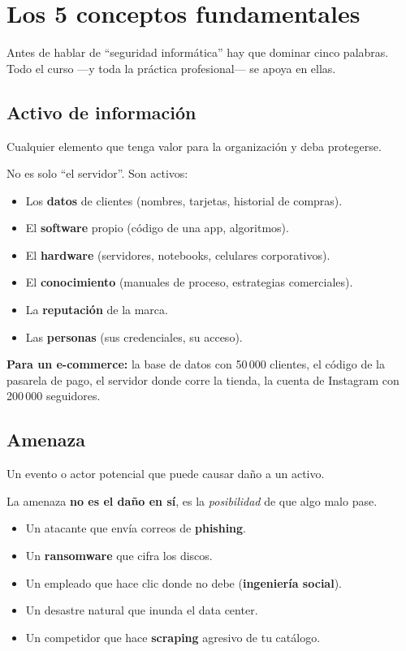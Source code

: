 \documentclass[12pt,a4paper]{article}
\begin{document}
\section{Los 5 conceptos fundamentales}

Antes de hablar de ``seguridad informática'' hay que dominar cinco palabras.
Todo el curso ---y toda la práctica profesional--- se apoya en ellas.

\subsection{Activo de información}
\begin{cajaDefinicion}
Cualquier elemento que tenga valor para la organización y deba protegerse.
\end{cajaDefinicion}

No es solo ``el servidor''. Son activos:
\begin{itemize}[leftmargin=2em]
  \item Los \textbf{datos} de clientes (nombres, tarjetas, historial de compras).
  \item El \textbf{software} propio (código de una app, algoritmos).
  \item El \textbf{hardware} (servidores, notebooks, celulares corporativos).
  \item El \textbf{conocimiento} (manuales de proceso, estrategias comerciales).
  \item La \textbf{reputación} de la marca.
  \item Las \textbf{personas} (sus credenciales, su acceso).
\end{itemize}

\begin{cajaEjemplo}
\textbf{Para un e-commerce:} la base de datos con 50\,000 clientes, el código de
la pasarela de pago, el servidor donde corre la tienda, la cuenta de Instagram
con 200\,000 seguidores.
\end{cajaEjemplo}

\subsection{Amenaza}
\begin{cajaDefinicion}
Un evento o actor potencial que puede causar daño a un activo.
\end{cajaDefinicion}

La amenaza \textbf{no es el daño en sí}, es la \emph{posibilidad} de que algo malo pase.
\begin{itemize}[leftmargin=2em]
  \item Un atacante que envía correos de \textbf{phishing}.
  \item Un \textbf{ransomware} que cifra los discos.
  \item Un empleado que hace clic donde no debe (\textbf{ingeniería social}).
  \item Un desastre natural que inunda el data center.
  \item Un competidor que hace \textbf{scraping} agresivo de tu catálogo.
\end{itemize}
\end{document}
